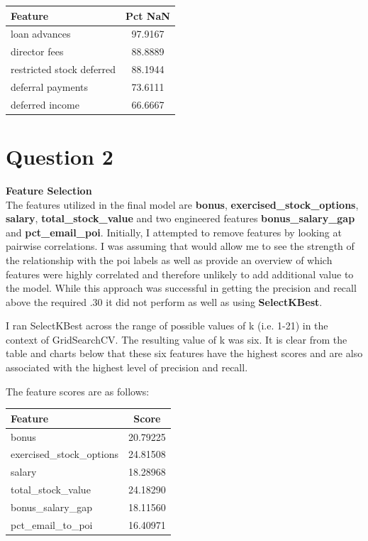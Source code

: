 \documentclass[a4paper,11pt]{report}
\begin{document}
\begin{center}
    \begin{tabular}{|| l c ||}
        \hline Feature & Pct NaN \\
        \hline\hline
        loan advances & 97.9167 \\
        \hline
        director fees & 88.8889 \\
        \hline
        restricted stock deferred & 88.1944 \\
        \hline
        deferral payments & 73.6111 \\
        \hline
        deferred income & 66.6667 \\
        \hline
    \end{tabular}
\end{center}

\section{Question 2}

\textbf{Feature Selection} \\

The features utilized in the final model are \textbf{bonus},
\textbf{exercised\_stock\_options}, \textbf{salary}, \textbf{total\_stock\_value}
and two engineered features \textbf{bonus\_salary\_gap} and
\textbf{pct\_email\_poi}. Initially, I attempted to remove features by looking
at pairwise correlations.  I was assuming that would allow me to see the
strength of the relationship with the poi labels as well as provide an overview
of which features were highly correlated and therefore unlikely to add
additional value to the model.  While this approach was successful in
getting the precision and recall above the required .30 it did not perform as
well as using \textbf{SelectKBest}.

I ran SelectKBest across the range of possible values of k (i.e. 1-21) in the
context of GridSearchCV.  The resulting value of k was six.  It is clear from the
table and charts below that these six features have the highest scores and are also
associated with the highest level of precision and recall.

The feature scores are as follows: \\

\begin{center}
    \begin{tabular}{|| l c ||}
        \hline Feature & Score \\
        \hline\hline
        bonus & 20.79225 \\
        \hline
        exercised\_stock\_options & 24.81508 \\
        \hline
        salary & 18.28968 \\
        \hline
        total\_stock\_value & 24.18290 \\
        \hline
        bonus\_salary\_gap & 18.11560 \\
        \hline
        pct\_email\_to\_poi & 16.40971 \\
        \hline
    \end{tabular}
\end{center}
\end{document}
